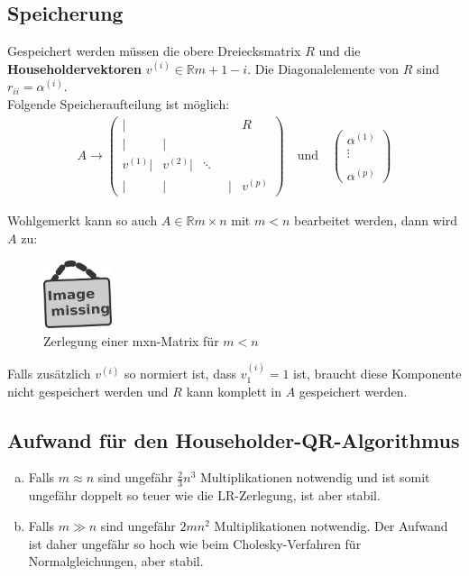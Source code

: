 \documentclass[ngerman,fontsize=11pt, paper=a4, parskip=half, titlepage=true, toc=bib]{scrbook}
\newcommand{\R}{\mathds{R}}
\newcommand{\imagemissing}[1]{
	\begin{figure}
		\centering
		\includegraphics[width=2cm]{images/image_missing.jpg}
		\caption{#1}
	\end{figure}
}
\begin{document}
	\subsection{Speicherung}
	Gespeichert werden müssen die obere Dreiecksmatrix $R$ und die 
	\textbf{Householdervektoren} 
	$v^{(i)}\in \R{m+1-i}$.
	Die Diagonalelemente von $R$ sind $r_{ii} = \alpha^{(i)}$. \\
	Folgende Speicheraufteilung ist möglich:
	\begin{gather*}
		A \longrightarrow \left(
		\begin{array}{rrrrr}
			|&&& R \\
			|&| \\
			v^{(1)}| & v^{(2)}|&\ddots ~~\\
			| &|&\phantom{v^{(i)}}|& v^{(p)}			
		\end{array}
		\right)
		\quad \text{und} \quad 
		\begin{pmatrix}
			\alpha^{(1)} \\ \vdots \\ \\ \alpha^{(p)}
		\end{pmatrix}
	\end{gather*}
	  
	  Wohlgemerkt kann so auch $A\in \R{m\times n}$ mit $m<n$ bearbeitet werden,
	  dann wird $A$ zu:
	  
	  \imagemissing{Zerlegung einer mxn-Matrix für $m<n$}
	  
	  Falls zusätzlich $v^{(i)}$ so normiert ist,
	  dass $v_1^{(i)} = 1$ ist, braucht diese Komponente nicht gespeichert werden 
	  und $R$ kann komplett in $A$ gespeichert werden.
	  
	  \subsection{Aufwand für den Householder-QR-Algorithmus}
	  \begin{enumerate}[a)]
	  	\item Falls $m\approx n$ sind ungefähr $\frac{2}{3}n^3$ Multiplikationen notwendig
	  	und ist somit ungefähr doppelt so teuer wie die LR-Zerlegung, ist aber stabil.
	  	\item Falls $m\gg n$ sind ungefähr $2mn^2$ Multiplikationen notwendig.
	  	Der Aufwand ist daher ungefähr so hoch wie beim Cholesky-Verfahren für Normalgleichungen,
	  	aber stabil.
	  \end{enumerate}
	  
	  
\end{document}
